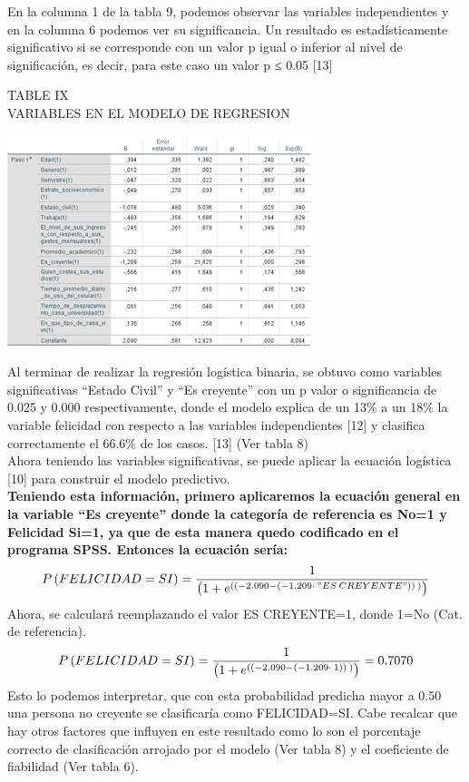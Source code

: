 \documentclass[conference]{IEEEtran}
\begin{document}
  En la columna 1 de la tabla 9, podemos observar las variables independientes y en la columna 6 podemos ver su significancia. Un resultado es estadísticamente significativo si se corresponde con un valor p igual o inferior al nivel de significación, es decir, para este caso un valor p ≤ 0.05 [13]\\
\begin{center}
\caption{TABLE IX\\
VARIABLES EN EL MODELO DE REGRESION}
\includegraphics{imagenes/IMAGEN24.png}
\end{center}
Al terminar de realizar la regresión logística binaria, se obtuvo como variables significativas “Estado Civil” y “Es creyente” con un p valor o significancia de 0.025 y 0.000 respectivamente, donde el modelo explica de un 13\% a un 18\% la variable felicidad con respecto a las variables independientes [12] y clasifica correctamente el 66.6\% de los casos. [13] (Ver tabla 8)\\

Ahora teniendo las variables significativas, se puede aplicar la ecuación logística [10] para construir el modelo predictivo.\\

\textbf{Teniendo esta información, primero aplicaremos la ecuación general en la variable “Es creyente” donde la categoría de referencia es No=1 y Felicidad Si=1, ya que de esta manera quedo codificado en el programa SPSS. Entonces la ecuación sería:}\\
\begin{equation}\tiny
P\left(FELICIDAD=SI\right)=\frac{1}{\left(1+e^{\left(\left(-2.090-\left(-1.209\cdot \:"ES\:CREYENTE"\right)\right)\:\right)}\right)}
\end{equation}
   Ahora, se calculará reemplazando el valor ES CREYENTE=1, donde 1=No (Cat. de referencia). \\
   \begin{equation}\tiny
 P\left(FELICIDAD=SI\right)=\frac{1}{\left(1+e^{\left(\left(-2.090-\left(-1.209\cdot \:1\right)\right)\:\right)}\right)}=0.7070
 \end{equation}
Esto lo podemos interpretar, que con esta probabilidad predicha mayor a 0.50 una persona no creyente se clasificaría como FELICIDAD=SI. Cabe recalcar que hay otros factores que influyen en este resultado como lo son el porcentaje correcto de clasificación arrojado por el modelo (Ver tabla 8) y el coeficiente de fiabilidad (Ver tabla 6).\\
\end{document}
